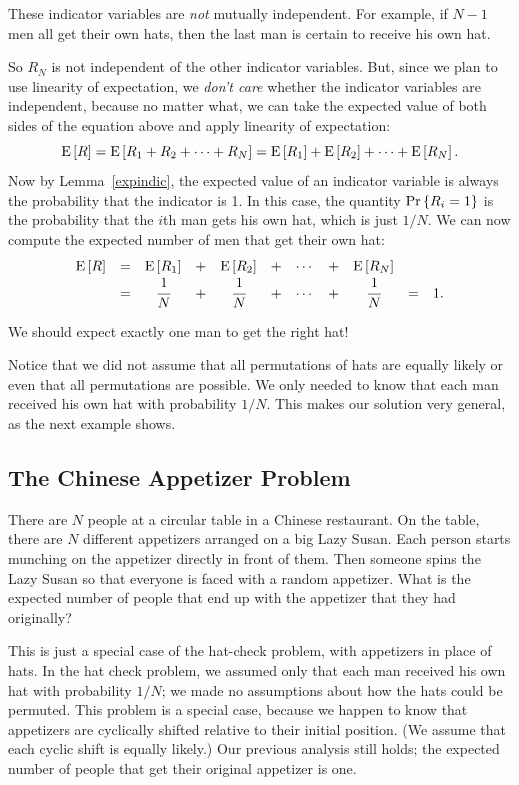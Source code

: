 \documentclass[11pt,twoside]{article}
\begin{document}
These indicator variables are {\em not} mutually independent.  For
example, if $N-1$ men all get their own hats, then the last man is
certain to receive his own hat.

So $R_N$ is not independent of the other indicator variables.  But, since
we plan to use linearity of expectation, we \emph{don't care} whether the
indicator variables are independent, because no matter what,
we can take the expected value of both sides of the equation above and
apply linearity of expectation:
\begin{equation*}
\mathop{\textup{E}}\nolimits\left[R\right] =  \mathop{\textup{E}}\nolimits\left[R_1 + R_2 + \cdots + R_N\right] 
           =  \mathop{\textup{E}}\nolimits\left[R_1\right] + \mathop{\textup{E}}\nolimits\left[R_2\right] + \cdots + \mathop{\textup{E}}\nolimits\left[R_N\right].
\end{equation*}
Now by Lemma~\ref{expindic}, the expected value of an indicator variable
is always the probability that the indicator is 1.  In this case, the
quantity $\mathop{\textup{Pr}}\nolimits\left\{R_i = 1\right\}$ is the probability that the $i$th man gets his
own hat, which is just $1/N$.  We can now compute the expected number of
men that get their own hat:
\[\begin{array}{rcccccccccc}
\mathop{\textup{E}}\nolimits\left[R\right] &=&  \mathop{\textup{E}}\nolimits\left[R_1\right] &+& \mathop{\textup{E}}\nolimits\left[R_2\right] &+& \cdots &+& \mathop{\textup{E}}\nolimits\left[R_N\right] \\
           &=&  \cfrac{1}{N} &+& \cfrac{1}{N} &+& \cdots &+& \cfrac{1}{N} &=& 1.
\end{array}\]

We should expect exactly one man to get the right hat!

Notice that we did not assume that all permutations of hats are
equally likely or even that all permutations are possible.  We only needed
to know that each man received his own hat with probability
$1/N$.  This makes our solution very general, as the next
example shows.

\subsection{The Chinese Appetizer Problem}

There are $N$ people at a circular table in a Chinese restaurant.  On
the table, there are $N$ different appetizers arranged on a big Lazy
Susan.  Each person starts munching on the appetizer directly in front
of them.  Then someone spins the Lazy Susan so that everyone is faced
with a random appetizer.  What is the expected number of people that
end up with the appetizer that they had originally?

This is just a special case of the hat-check problem, with appetizers in
place of hats.  In the hat check problem, we assumed only that each man
received his own hat with probability $1/N$; we made no assumptions about
how the hats could be permuted.  This problem is a special case, because
we happen to know that appetizers are cyclically shifted relative to their
initial position.  (We assume that each cyclic shift is equally likely.)
Our previous analysis still holds; the expected number of people that get
their original appetizer is one.
\end{document}
